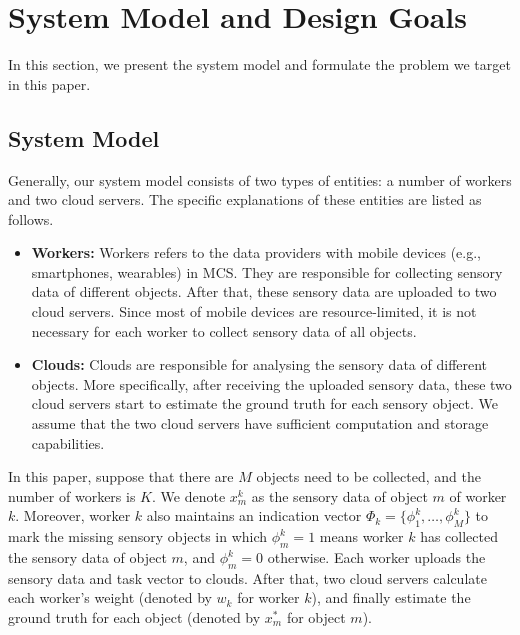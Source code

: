 \documentclass[conference]{IEEEtran}
\begin{document}
\section{System Model and Design Goals}

In this section, we present the system model and formulate the problem we target in this paper.
\subsection{System Model}

Generally, our system model consists of two types of entities: a number of workers and two cloud servers. %
The specific explanations of these entities are listed as follows.
\begin{itemize}
  \item \textbf{Workers:} Workers refers to the data providers with mobile devices (e.g., smartphones, wearables) in MCS. They are responsible for collecting sensory data of different objects. After that, these sensory data are uploaded to two cloud servers.  Since most of mobile devices are resource-limited, it is not necessary for each worker to collect sensory data of all objects.
  \item \textbf{Clouds:} Clouds are responsible for analysing the sensory data of different objects. More specifically, after receiving the uploaded sensory data, these two cloud servers start to estimate the ground truth for each sensory object. We assume that the two cloud servers have sufficient computation and storage capabilities.
\end{itemize}
In this paper, suppose that there are $M$ objects need to be collected, and the number of workers is $K$.
We denote $x_m^k$ as the sensory data of object $m$ of worker $k$.
Moreover, worker $k$ also maintains an indication vector $\Phi_k = \{\phi_1^k, \ldots, \phi_M^k\}$ to mark the missing sensory objects in which $\phi_m^k = 1$ means worker $k$ has collected the sensory data of object $m$, and $\phi_m^k = 0$ otherwise.
Each worker uploads the sensory data and task vector to clouds.
After that, two cloud servers calculate each worker's weight (denoted by $w_k$ for worker $k$), and finally estimate the ground truth for each object (denoted by $x_m^*$ for object $m$). 
\end{document}
